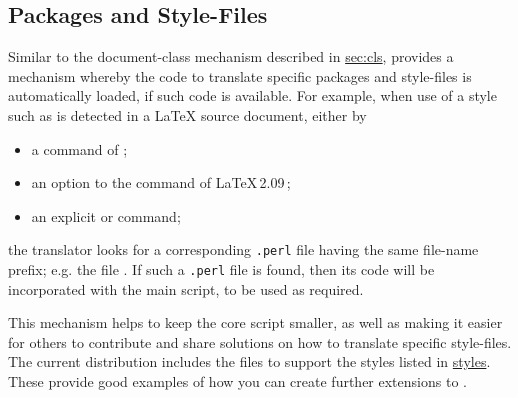 \subsection{Packages and Style-Files\label{sec:sty}}
\tableofchildlinks*
{}%
\html{\\}%
%
Similar to the document-class mechanism described in
\hyperref{the previous section}{Section}{}{sec:cls},
\latextohtml{} provides a mechanism whereby the code to translate specific
packages and style-files is auto\-matic\-ally loaded, if such code is available.
For example, when use of a style such as  
is detected in a \LaTeX{} source document, either by
\begin{itemize}
\item
a  command of \LaTeXe;
\item
an option to the  command of \LaTeX\,2.09\,;
\item
an explicit  or  command;
\end{itemize}
the translator looks for a corresponding \texttt{.perl} file
having the same file-name prefix;
e.g. the file .
If such a \texttt{.perl} file is found, 
then its code will be incorporated with the main script,
to be used as required. 

\html{\\}%

This mechanism helps to keep the core script smaller, as well as making
it easier for others to contribute and share solutions on  
how to translate specific style-files.
The current distribution includes the files to support the styles
listed in \hyperref{the table below}{Table~}{}{styles}.
These provide good examples of how you can create 
further extensions to \latextohtml.%

